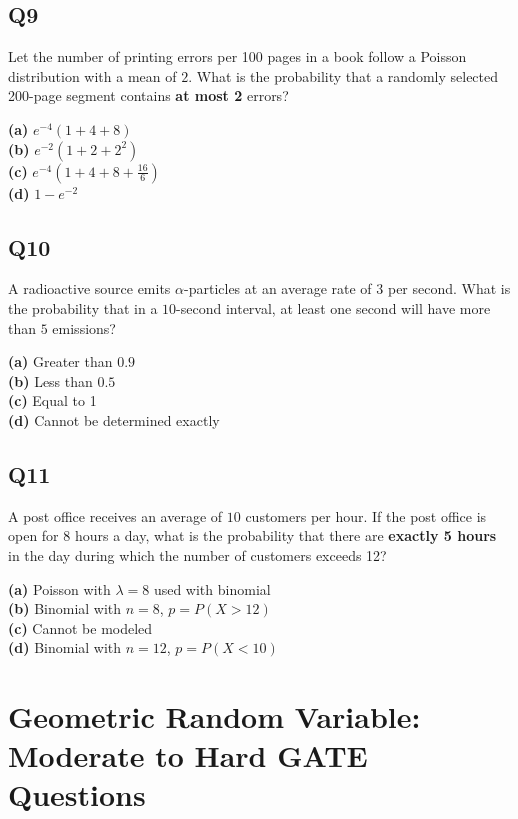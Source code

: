 \newpage
\subsection*{Q9}
Let the number of printing errors per 100 pages in a book follow a Poisson distribution with a mean of $2$. What is the probability that a randomly selected 200-page segment contains \textbf{at most 2} errors?

\textbf{(a)} $e^{-4}(1 + 4 + 8)$  \\
\textbf{(b)} $e^{-2}(1 + 2 + 2^2)$  \\
\textbf{(c)} $e^{-4}(1 + 4 + 8 + \frac{16}{6})$  \\
\textbf{(d)} $1 - e^{-2}$

\subsection*{Q10}
A radioactive source emits $\alpha$-particles at an average rate of $3$ per second. What is the probability that in a $10$-second interval, at least one second will have more than $5$ emissions?

\textbf{(a)} Greater than $0.9$  \\
\textbf{(b)} Less than $0.5$  \\
\textbf{(c)} Equal to 1  \\
\textbf{(d)} Cannot be determined exactly\\

\subsection*{Q11}
A post office receives an average of $10$ customers per hour. If the post office is open for $8$ hours a day, what is the probability that there are \textbf{exactly 5 hours} in the day during which the number of customers exceeds 12?

\textbf{(a)} Poisson with $\lambda = 8$ used with binomial  \\
\textbf{(b)} Binomial with $n=8$, $p = P(X>12)$  \\
\textbf{(c)} Cannot be modeled  \\
\textbf{(d)} Binomial with $n=12$, $p = P(X<10)$\\

\section{Geometric Random Variable: Moderate to Hard GATE Questions}

